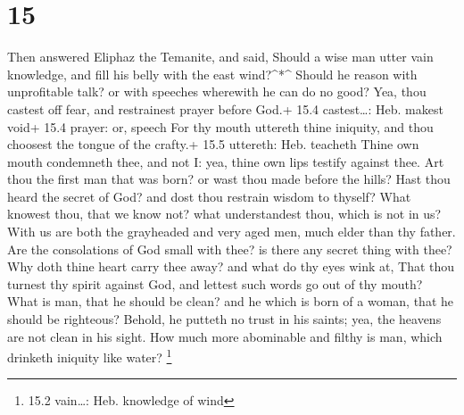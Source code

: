 \hypertarget{section-14}{%
\section{15}\label{section-14}}

 Then answered Eliphaz the Temanite, and said, 
Should a wise man utter vain knowledge, and fill his belly with the east
wind?\^{}*\^{}  Should he reason with unprofitable talk? or
with speeches wherewith he can do no good?  Yea, thou
castest off fear, and restrainest prayer before God.+ 15.4
castest\ldots: Heb. makest void+ 15.4 prayer: or, speech 
For thy mouth uttereth thine iniquity, and thou choosest the tongue of
the crafty.+ 15.5 uttereth: Heb. teacheth  Thine own mouth
condemneth thee, and not I: yea, thine own lips testify against thee.
 Art thou the first man that was born? or wast thou made
before the hills?  Hast thou heard the secret of God? and
dost thou restrain wisdom to thyself?  What knowest thou,
that we know not? what understandest thou, which is not in us?
 With us are both the grayheaded and very aged men, much
elder than thy father.  Are the consolations of God small
with thee? is there any secret thing with thee?  Why doth
thine heart carry thee away? and what do thy eyes wink at, 
That thou turnest thy spirit against God, and lettest such words go out
of thy mouth?  What is man, that he should be clean? and he
which is born of a woman, that he should be righteous? 
Behold, he putteth no trust in his saints; yea, the heavens are not
clean in his sight.  How much more abominable and filthy is
man, which drinketh iniquity like water? \footnote{15.2 vain\ldots: Heb.
  knowledge of wind}

